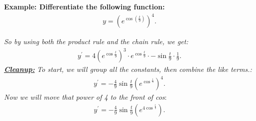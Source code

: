 \documentclass{report}
\begin{document}
  \pagebreak \bigbreak \noindent
  \begin{mdframed}
    \textbf{Example: Differentiate the following function:}
    \begin{align*}
      y=  (e^{\cos{(\frac{t}{9})}})^4
    .\end{align*}
  \end{mdframed}
  \bigbreak \noindent 
  \textit{So by using both the product rule and the chain rule, we get:}
  \begin{align*}
    y^{\prime} = 4(e^{\cos{\frac{t}{9}}})^3 \cdot e^{\cos{\frac{t}{9}}} \cdot -\sin{\frac{t}{9}} \cdot \frac{1}{9}
  .\end{align*}
  \bigbreak \noindent 
  \textbf{\textit{\underline{Cleanup:}}}
  \bigbreak \noindent 
  \textit{To start, we will group all the constants, then combine the like terms.:}
  \begin{align*}
    y ^{\prime} = - \frac{4}{9}\sin{\frac{t}{9}}(e^{\cos{^{\frac{t}{9}}}})^4
  .\end{align*}
  \bigbreak \noindent 
  \textit{Now we will move that power of 4 to the front of cos}:
  \begin{align*}
    y ^{\prime} = - \frac{4}{9}\sin{\frac{t}{9}}(e^{4\cos{^{\frac{t}{9}}}})
  .\end{align*}
  
\end{document}
